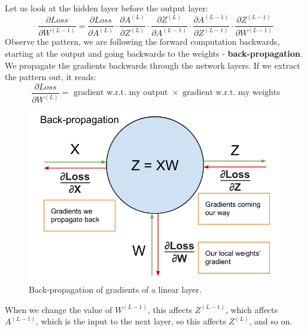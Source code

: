 \documentclass[11pt]{article}
\begin{document}
Let us look at the hidden layer before the output layer:
\[
  \frac{\partial Loss}{\partial W^{(L - 1)}} = \frac{\partial Loss}{\partial A^{(L)}} \cdot \frac{\partial A^{(L)}}{\partial Z^{(L)}} \cdot \frac{\partial Z^{(L)}}{\partial A^{(L - 1)}} \cdot \frac{\partial A^{(L - 1)}}{\partial Z^{(L - 1)}} \cdot \frac{\partial Z^{(L - 1)}}{\partial W^{(L - 1)}}
\]
Observe the pattern, we are following the forward computation backwards, starting at the output and going backwards to the weights - \textbf{back-propagation}.
We propagate the gradients backwards through the network layers.
If we extract the pattern out, it reads:
\[
  \frac{\partial Loss}{\partial W^{(L)}}  = \text{ gradient w.r.t. my output } \times \text{ gradient w.r.t. my weights}
\]

\begin{figure}[htb!]
  \centering
  \caption{Back-propagation of gradients of a linear layer.}
  \includegraphics[scale=0.4]{backpropagation}
\end{figure}

When we change the value of $W^{(L - 1)}$, this affects $Z^{(L - 1)}$, which affects $A^{(L - 1)}$, which is the input to the next layer, so this affects $Z^{(L)}$, and so on.
\end{document}
